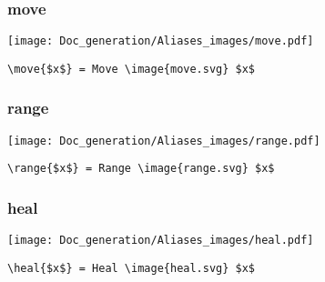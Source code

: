 \documentclass{article}
\begin{document}
\subsubsection{move}
\begin{minipage}{0.45\linewidth}
\raggedright
\begin{spverbatim}
\end{spverbatim}
\end{minipage}
\begin{minipage}{0.45\linewidth}
\raggedleft
\texttt{[image: Doc\_generation/Aliases\_images/move.pdf]}
\end{minipage}
\begin{center}
\begin{BVerbatim}
\move{$x$} = Move \image{move.svg} $x$
\end{BVerbatim}
\end{center}

\subsubsection{range}
\begin{minipage}{0.45\linewidth}
\raggedright
\begin{spverbatim}
\end{spverbatim}
\end{minipage}
\begin{minipage}{0.45\linewidth}
\raggedleft
\texttt{[image: Doc\_generation/Aliases\_images/range.pdf]}
\end{minipage}
\begin{center}
\begin{BVerbatim}
\range{$x$} = Range \image{range.svg} $x$
\end{BVerbatim}
\end{center}

\subsubsection{heal}
\begin{minipage}{0.45\linewidth}
\raggedright
\begin{spverbatim}
\end{spverbatim}
\end{minipage}
\begin{minipage}{0.45\linewidth}
\raggedleft
\texttt{[image: Doc\_generation/Aliases\_images/heal.pdf]}
\end{minipage}
\begin{center}
\begin{BVerbatim}
\heal{$x$} = Heal \image{heal.svg} $x$
\end{BVerbatim}
\end{center}
\end{document}
